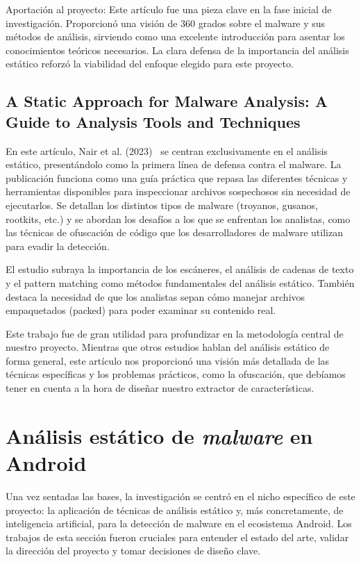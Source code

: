 Aportación al proyecto: Este artículo fue una pieza clave en la fase inicial de investigación. Proporcionó una visión de 360 grados sobre el malware y sus métodos de análisis, sirviendo como una excelente introducción para asentar los conocimientos teóricos necesarios. La clara defensa de la importancia del análisis estático reforzó la viabilidad del enfoque elegido para este proyecto.

\subsection{A Static Approach for Malware Analysis: A Guide to Analysis Tools and Techniques}

En este artículo, Nair et al. (2023)~\cite{nair2023static} se centran exclusivamente en el análisis estático, presentándolo como la primera línea de defensa contra el malware. La publicación funciona como una guía práctica que repasa las diferentes técnicas y herramientas disponibles para inspeccionar archivos sospechosos sin necesidad de ejecutarlos. Se detallan los distintos tipos de malware (troyanos, gusanos, rootkits, etc.) y se abordan los desafíos a los que se enfrentan los analistas, como las técnicas de ofuscación de código que los desarrolladores de malware utilizan para evadir la detección.

El estudio subraya la importancia de los escáneres, el análisis de cadenas de texto y el pattern matching como métodos fundamentales del análisis estático. También destaca la necesidad de que los analistas sepan cómo manejar archivos empaquetados (packed) para poder examinar su contenido real.

Este trabajo fue de gran utilidad para profundizar en la metodología central de nuestro proyecto. Mientras que otros estudios hablan del análisis estático de forma general, este artículo nos proporcionó una visión más detallada de las técnicas específicas y los problemas prácticos, como la ofuscación, que debíamos tener en cuenta a la hora de diseñar nuestro extractor de características.

\section{Análisis estático de \textit{malware} en Android}

Una vez sentadas las bases, la investigación se centró en el nicho específico de este proyecto: la aplicación de técnicas de análisis estático y, más concretamente, de inteligencia artificial, para la detección de malware en el ecosistema Android. Los trabajos de esta sección fueron cruciales para entender el estado del arte, validar la dirección del proyecto y tomar decisiones de diseño clave.

